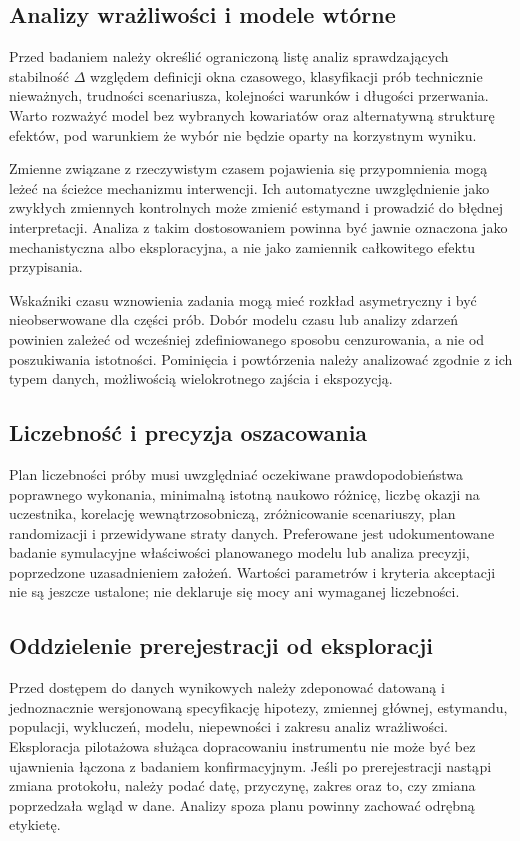 \documentclass[11pt,a4paper]{article}
\begin{document}
\subsection{Analizy wrażliwości i modele wtórne}
Przed badaniem należy określić ograniczoną listę analiz sprawdzających stabilność \(\Delta\) względem definicji okna czasowego, klasyfikacji prób technicznie nieważnych, trudności scenariusza, kolejności warunków i długości przerwania. Warto rozważyć model bez wybranych kowariatów oraz alternatywną strukturę efektów, pod warunkiem że wybór nie będzie oparty na korzystnym wyniku.

Zmienne związane z rzeczywistym czasem pojawienia się przypomnienia mogą leżeć na ścieżce mechanizmu interwencji. Ich automatyczne uwzględnienie jako zwykłych zmiennych kontrolnych może zmienić estymand i prowadzić do błędnej interpretacji. Analiza z takim dostosowaniem powinna być jawnie oznaczona jako mechanistyczna albo eksploracyjna, a nie jako zamiennik całkowitego efektu przypisania.

Wskaźniki czasu wznowienia zadania mogą mieć rozkład asymetryczny i być nieobserwowane dla części prób. Dobór modelu czasu lub analizy zdarzeń powinien zależeć od wcześniej zdefiniowanego sposobu cenzurowania, a nie od poszukiwania istotności. Pominięcia i powtórzenia należy analizować zgodnie z ich typem danych, możliwością wielokrotnego zajścia i ekspozycją.

\subsection{Liczebność i precyzja oszacowania}
Plan liczebności próby musi uwzględniać oczekiwane prawdopodobieństwa poprawnego wykonania, minimalną istotną naukowo różnicę, liczbę okazji na uczestnika, korelację wewnątrzosobniczą, zróżnicowanie scenariuszy, plan randomizacji i przewidywane straty danych. Preferowane jest udokumentowane badanie symulacyjne właściwości planowanego modelu lub analiza precyzji, poprzedzone uzasadnieniem założeń. Wartości parametrów i kryteria akceptacji nie są jeszcze ustalone; nie deklaruje się mocy ani wymaganej liczebności.

\subsection{Oddzielenie prerejestracji od eksploracji}
Przed dostępem do danych wynikowych należy zdeponować datowaną i jednoznacznie wersjonowaną specyfikację hipotezy, zmiennej głównej, estymandu, populacji, wykluczeń, modelu, niepewności i zakresu analiz wrażliwości. Eksploracja pilotażowa służąca dopracowaniu instrumentu nie może być bez ujawnienia łączona z badaniem konfirmacyjnym. Jeśli po prerejestracji nastąpi zmiana protokołu, należy podać datę, przyczynę, zakres oraz to, czy zmiana poprzedzała wgląd w dane. Analizy spoza planu powinny zachować odrębną etykietę.
\end{document}
